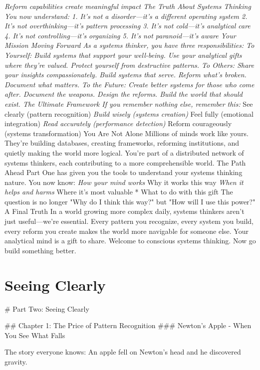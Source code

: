 \documentclass[12pt]{book}
\begin{document}
\textit{ Reform capabilities create meaningful impact
The Truth About Systems Thinking
You now understand:
1. It's not a disorder—it's a different operating system
2. It's not overthinking—it's pattern processing
3. It's not cold—it's analytical care
4. It's not controlling—it's organizing
5. It's not paranoid—it's aware
Your Mission Moving Forward
As a systems thinker, you have three responsibilities:
To Yourself: Build systems that support your well-being. Use your analytical gifts where they're valued. Protect yourself from destructive patterns.
To Others: Share your insights compassionately. Build systems that serve. Reform what's broken. Document what matters.
To the Future: Create better systems for those who come after. Document the weapons. Design the reforms. Build the world that should exist.
The Ultimate Framework
If you remember nothing else, remember this:
} See clearly (pattern recognition)
\textit{ Build wisely (systems creation)
} Feel fully (emotional integration)
\textit{ Read accurately (performance detection)
} Reform courageously (systems transformation)
You Are Not Alone
Millions of minds work like yours. They're building databases, creating frameworks, reforming institutions, and quietly making the world more logical. You're part of a distributed network of systems thinkers, each contributing to a more comprehensible world.
The Path Ahead
Part One has given you the tools to understand your systems thinking nature. You now know:
\textit{ How your mind works
} Why it works this way
\textit{ When it helps and harms
} Where it's most valuable
* What to do with this gift
The question is no longer "Why do I think this way?" but "How will I use this power?"
A Final Truth
In a world growing more complex daily, systems thinkers aren't just useful—we're essential. Every pattern you recognize, every system you build, every reform you create makes the world more navigable for someone else.
Your analytical mind is a gift to share.
Welcome to conscious systems thinking. Now go build something better.




\part{Seeing Clearly}
\# Part Two: Seeing Clearly

\#\# Chapter 1: The Price of Pattern Recognition
\#\#\# Newton's Apple - When You See What Falls

The story everyone knows: An apple fell on Newton's head and he discovered gravity.
\end{document}

